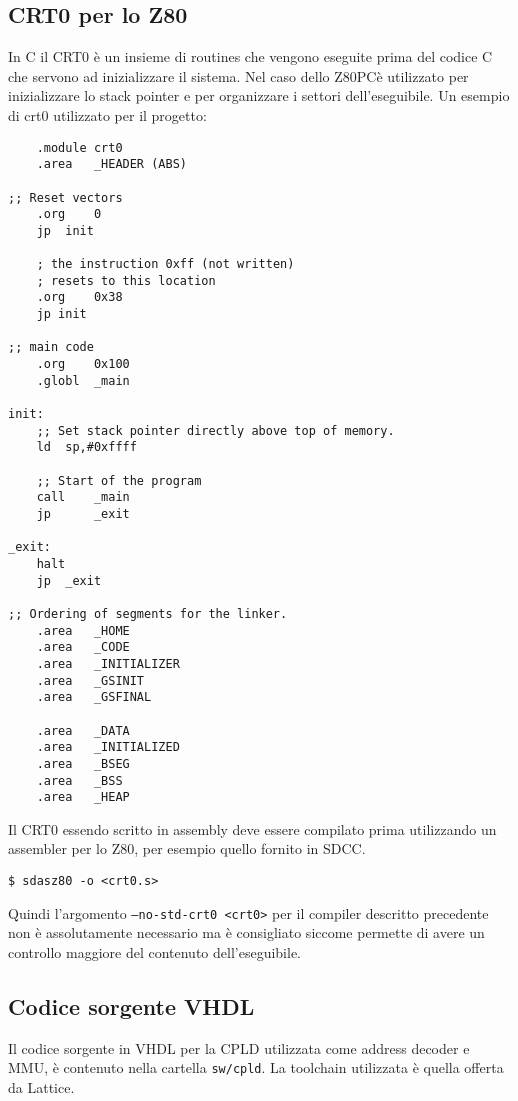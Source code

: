 \documentclass[a4paper, 11pt]{article}
\newcommand{\prj}{Z80\textmu PC\xspace}
\begin{document}
\subsection{CRT0 per lo Z80}
In C il CRT0 \`e un insieme di routines che vengono eseguite prima del codice
C che servono ad inizializzare il sistema. Nel caso dello \prj \`e utilizzato
per inizializzare lo stack pointer e per organizzare i settori dell'eseguibile. 
Un esempio di crt0 utilizzato per il progetto:

\lstset{escapechar=@,style=customasm}
\begin{lstlisting}
    .module crt0
    .area   _HEADER (ABS)

;; Reset vectors
    .org    0
    jp  init

    ; the instruction 0xff (not written)
    ; resets to this location
    .org    0x38 
    jp init

;; main code
    .org    0x100
    .globl  _main

init:
    ;; Set stack pointer directly above top of memory.
    ld  sp,#0xffff

    ;; Start of the program
    call    _main
    jp      _exit

_exit:
    halt
    jp  _exit

;; Ordering of segments for the linker.
    .area   _HOME
    .area   _CODE
    .area   _INITIALIZER
    .area   _GSINIT
    .area   _GSFINAL

    .area   _DATA
    .area   _INITIALIZED
    .area   _BSEG
    .area   _BSS
    .area   _HEAP
\end{lstlisting}

Il CRT0 essendo scritto in assembly deve essere compilato prima utilizzando un
assembler per lo Z80, per esempio quello fornito in SDCC.\@
\begin{verbatim}
$ sdasz80 -o <crt0.s>
\end{verbatim}

Quindi l'argomento {\tt --no-std-crt0 <crt0>} per il compiler descritto precedente non 
\`e assolutamente necessario ma \`e consigliato siccome permette di avere un
controllo maggiore del contenuto dell'eseguibile.

\subsection{Codice sorgente VHDL}
Il codice sorgente in VHDL per la CPLD utilizzata come address decoder e MMU, 
\`e contenuto nella cartella {\tt sw/cpld}. La toolchain utilizzata \`e quella
offerta da Lattice.
\end{document}
